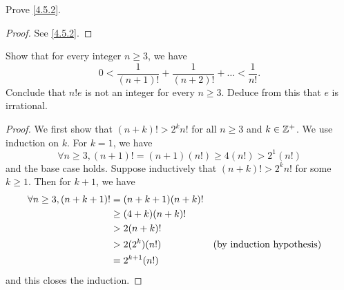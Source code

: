 \exercisesection

\begin{ex}\label{ex:4.5.1}
  Prove \cref{4.5.2}.
\end{ex}

\begin{proof}
  See \cref{4.5.2}.
\end{proof}

\begin{ex}\label{ex:4.5.2}
  Show that for every integer \(n \geq 3\), we have
  \[
    0 < \dfrac{1}{(n + 1)!} + \dfrac{1}{(n + 2)!} + \dots < \dfrac{1}{n!}.
  \]
  Conclude that \(n! e\) is not an integer for every \(n \geq 3\).
  Deduce from this that \(e\) is irrational.
\end{ex}

\begin{proof}
  We first show that \((n + k)! > 2^k n!\) for all \(n \geq 3\) and \(k \in \mathbb{Z}^+\).
  We use induction on \(k\).
  For \(k = 1\), we have
  \[
    \forall n \geq 3, (n + 1)! = (n + 1) (n!) \geq 4 (n!) > 2^1 (n!)
  \]
  and the base case holds.
  Suppose inductively that \((n + k)! > 2^k n!\) for some \(k \geq 1\).
  Then for \(k + 1\), we have
  \begin{align*}
    \forall n \geq 3, (n + k + 1)! & = (n + k + 1) (n + k)!            \\
                                   & \geq (4 + k)(n + k)!              \\
                                   & > 2 (n + k)!                      \\
                                   & > 2 (2^k) (n!)         &  & \text{(by induction hypothesis)} \\
                                   & = 2^{k + 1} (n!)
  \end{align*}
  and this closes the induction.


\end{proof}
